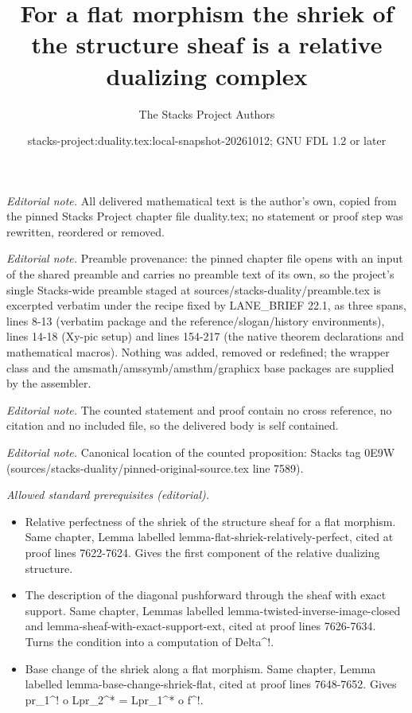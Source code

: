 \documentclass[10pt,a4paper]{amsart}
\title{For a flat morphism the shriek of the structure sheaf is a relative dualizing complex}
\author{The Stacks Project Authors}
\date{stacks-project:duality.tex:local-snapshot-20261012; GNU FDL 1.2 or later}
\theoremstyle{plain}
\theoremstyle{definition}
\theoremstyle{remark}
\numberwithin{equation}{subsection}
\begin{document}
\maketitle
\noindent\textit{Editorial note.} All delivered mathematical text is the author's own, copied from the pinned Stacks Project chapter file duality.tex; no statement or proof step was rewritten, reordered or removed.\par\medskip
\noindent\textit{Editorial note.} Preamble provenance: the pinned chapter file opens with an input of the shared preamble and carries no preamble text of its own, so the project's single Stacks-wide preamble staged at sources/stacks-duality/preamble.tex is excerpted verbatim under the recipe fixed by LANE\_BRIEF 22.1, as three spans, lines 8-13 (verbatim package and the reference/slogan/history environments), lines 14-18 (Xy-pic setup) and lines 154-217 (the native theorem declarations and mathematical macros). Nothing was added, removed or redefined; the wrapper class and the amsmath/amssymb/amsthm/graphicx base packages are supplied by the assembler.\par\medskip
\noindent\textit{Editorial note.} The counted statement and proof contain no cross reference, no citation and no included file, so the delivered body is self contained.\par\medskip
\noindent\textit{Editorial note.} Canonical location of the counted proposition: Stacks tag 0E9W (sources/stacks-duality/pinned-original-source.tex line 7589).\par\medskip
\noindent\textit{Allowed standard prerequisites (editorial).}\begin{itemize}
\item Relative perfectness of the shriek of the structure sheaf for a flat morphism. Same chapter, Lemma labelled lemma-flat-shriek-relatively-perfect, cited at proof lines 7622-7624. Gives the first component of the relative dualizing structure.
\item The description of the diagonal pushforward through the sheaf with exact support. Same chapter, Lemmas labelled lemma-twisted-inverse-image-closed and lemma-sheaf-with-exact-support-ext, cited at proof lines 7626-7634. Turns the condition into a computation of Delta\textasciicircum{}!.
\item Base change of the shriek along a flat morphism. Same chapter, Lemma labelled lemma-base-change-shriek-flat, cited at proof lines 7648-7652. Gives pr\_1\textasciicircum{}! o Lpr\_2\textasciicircum{}* = Lpr\_1\textasciicircum{}* o f\textasciicircum{}!.
\end{itemize}\medskip
\end{document}

